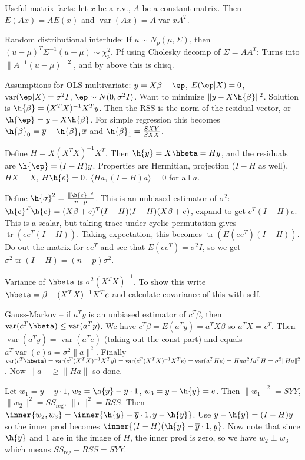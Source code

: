 \documentclass{article}
\newcommand{\conj}{\overline}
\DeclareMathOperator{\var}{var}
\DeclareMathOperator{\tr}{tr}
\begin{document}
\small
Useful matrix facts: let $x$ be a r.v., $A$ be a constant matrix. Then $E(Ax)=AE(x)$ and $\var(Ax)=A\var{x}A^T$.

Random distributional interlude: If $u\sim N_p(\mu,\Sigma)$, then $(u-\mu)^T\Sigma^{-1}(u-\mu)\sim\chi^2_p$. Pf using Cholesky decomp of $\Sigma=AA^T$: Turns into $\|A^{-1}(u-\mu)\|^2$, and by above this is chisq.

Assumptions for OLS multivariate: $y=X\beta+\ep$, $E(\ep|X)=0$, $\var(\ep|X)=\sigma^2I$, $\ep\sim N(0,\sigma^2I)$. Want to minimize $\|y-X\h{\beta}\|^2$. Solution is $\h{\beta}=(X^TX)^{-1}X^Ty$. Then the RSS is the norm of the residual vector, or $\h{\ep}=y-X\h{\beta}$. For simple regression this becomes $\h{\beta}_0=\conj{y}-\h{\beta}_1\conj{x}$ and $\h{\beta}_1=\frac{SXY}{SXX}$. 

Define $H=X(X^TX)^{-1}X^T$. Then $\h{y}=X\hbeta=Hy$, and the residuals are $\h{\ep}=(I-H)y$. Properties are Hermitian, projection ($I-H$ as well), $HX=X$, $H\h{e}=0$, $\langle Ha, (I-H)a\rangle=0$ for all $a$. 

Define $\h{\sigma}^2=\frac{\|\h{e}\|^2}{n-p}$. This is an unbiased estimator of $\sigma^2$: $\h{e}^T\h{e}=(X\beta+e)^T(I-H)(I-H)(X\beta+e)$, expand to get $e^T(I-H)e$. This is a scalar, but taking trace under cyclic permutation gives $\tr(ee^T(I-H))$. Taking expectation, this becomes $\tr(E(ee^T)(I-H))$. Do out the matrix for $ee^T$ and see that $E(ee^T)=\sigma^2I$, so we get $\sigma^2\tr(I-H)=(n-p)\sigma^2$.

Variance of $\hbeta$ is $\sigma^2(X^TX)^{-1}$. To show this write $\hbeta=\beta+(X^TX)^{-1}X^Te$ and calculate covariance of this with self.

Gauss-Markov -- if $a^Ty$ is an unbiased estimator of $c^T\beta$, then $\var(c^T\hbeta)\leq\var(a^Ty)$. We have $c^T\beta=E(a^Ty)=a^TX\beta$ so $a^TX=c^T$. Then $\var(a^Ty)=\var(a^Te)$ (taking out the const part) and equals $a^T\var(e)a=\sigma^2\|a\|^2$. Finally $\var(c^T\hbeta)=\var(c^T(X^TX)^{-1}X^Ty)=\var(c^T(X^TX)^{-1}X^Te)=\var(a^THe)=Ha\sigma^2Ia^TH=\sigma^2\|Ha\|^2$. Now $\|a\|\geq\|Ha\|$ so done.

Let $w_1=y-\conj{y}\cdot1$, $w_2=\h{y}-\conj{y}\cdot1$, $w_3=y-\h{y}=e$. Then $\|w_1\|^2=SYY$, $\|w_2\|^2=SS_\text{reg}$, $\|e\|^2=RSS$. Then $\inner{w_2,w_3}=\inner{\h{y}-\conj{y}\cdot1,y-\h{y}}$. Use $y-\h{y}=(I-H)y$ so the inner prod becomes $\inner{(I-H)(\h{y}-\conj{y}\cdot1, y}$. Now note that since $\h{y}$ and $1$ are in the image of $H$, the inner prod is zero, so we have $w_2\perp w_3$ which means $SS_\text{reg}+RSS=SYY$.
\end{document}
